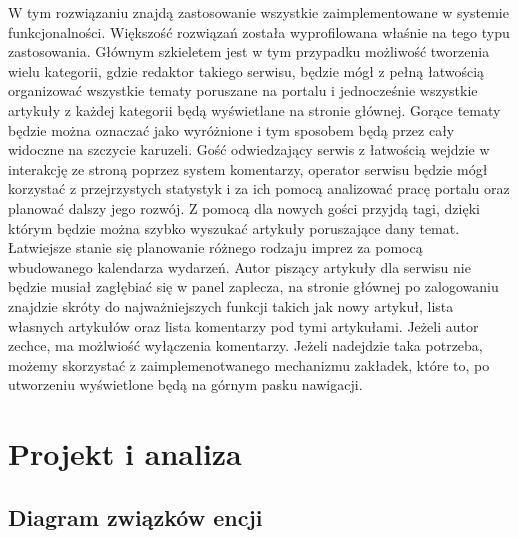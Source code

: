 \documentclass[openright]{xmgr}
\begin{document}
W tym rozwiązaniu znajdą zastosowanie wszystkie zaimplementowane w systemie funkcjonalności. Większość rozwiązań została wyprofilowana właśnie na tego typu zastosowania. Głównym szkieletem jest w tym przypadku możliwość tworzenia wielu kategorii, gdzie redaktor takiego serwisu, będzie mógł z pełną łatwością organizować wszystkie tematy poruszane na portalu i jednocześnie wszystkie artykuły z każdej kategorii będą wyświetlane na stronie głównej. Gorące tematy będzie można oznaczać jako wyróżnione i tym sposobem będą przez cały widoczne na szczycie karuzeli. Gość odwiedzający serwis z łatwością wejdzie w interakcję ze stroną poprzez system komentarzy, operator serwisu będzie mógł korzystać z przejrzystych statystyk i za ich pomocą analizować pracę portalu oraz planować dalszy jego rozwój. Z pomocą dla nowych gości przyjdą tagi, dzięki którym będzie można szybko wyszukać artykuły poruszające dany temat. Łatwiejsze stanie się planowanie różnego rodzaju imprez za pomocą wbudowanego kalendarza wydarzeń. Autor piszący artykuły dla serwisu nie będzie musiał zagłębiać się w panel zaplecza, na stronie głównej po zalogowaniu znajdzie skróty do najważniejszych funkcji takich jak nowy artykuł, lista własnych artykułów oraz lista komentarzy pod tymi artykułami. Jeżeli autor zechce,  ma możlwiość wyłączenia komentarzy. Jeżeli nadejdzie taka potrzeba, możemy skorzystać z zaimplemenotwanego mechanizmu zakładek, które to, po utworzeniu wyświetlone będą na górnym pasku nawigacji.

\chapter{Projekt i analiza}

\newpage

\section{Diagram związków encji}
\end{document}
